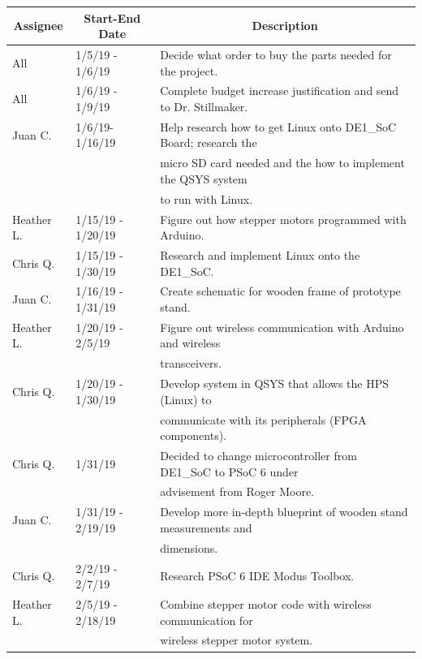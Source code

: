 \begin{table} [H]	
	\normalsize
	\centering
	\begin{tabular}{|l|l|l|}
		\hline
		\multicolumn{1}{|c|}{\textbf{Assignee}} & \multicolumn{1}{|c|}{\textbf{Start-End Date}} & \multicolumn{1}{|c|}{\textbf{Description}} \\
		\hline
		All & 1/5/19 - 1/6/19 			& Decide what order to buy the parts needed for the project. \\
		\hline
		All & 1/6/19 - 1/9/19 			& Complete budget increase justification and send to Dr. Stillmaker. \\
		\hline
		Juan C. & 1/6/19-1/16/19	 	& Help research how to get Linux onto DE1\_SoC Board; research the \\
				&						& micro SD card needed and the how to implement the QSYS system \\
				&						& to run with Linux. \\
		\hline
		Heather L. & 1/15/19 - 1/20/19 	& Figure out how stepper motors programmed with Arduino. \\
		\hline
		Chris Q. & 1/15/19 - 1/30/19 	& Research and implement Linux onto the DE1\_SoC. \\
		\hline
		Juan C. & 1/16/19 - 1/31/19 	& Create schematic for wooden frame of prototype stand. \\
		\hline
		Heather L. & 1/20/19 - 2/5/19 	& Figure out wireless communication with Arduino and wireless \\ 			&					& transceivers. \\
		\hline
		Chris Q. & 1/20/19 - 1/30/19 	& Develop system in QSYS that allows the HPS (Linux) to \\
				&						& communicate with its peripherals (FPGA components). \\
		\hline
		Chris Q. & 1/31/19 				& Decided to change microcontroller from DE1\_SoC to PSoC 6 under \\ 
				&						& advisement from Roger Moore. \\
		\hline
		Juan C. & 1/31/19 - 2/19/19 	& Develop more in-depth blueprint of wooden stand measurements and \\
				&						& dimensions. \\
				\hline
		Chris Q. & 2/2/19 - 2/7/19 		& Research PSoC 6 IDE Modus Toolbox. \\
		\hline
		Heather L. & 2/5/19 - 2/18/19 	& Combine stepper motor code with wireless communication for \\
				&						& wireless stepper motor system. \\

\end{tabular}
\end{table}
